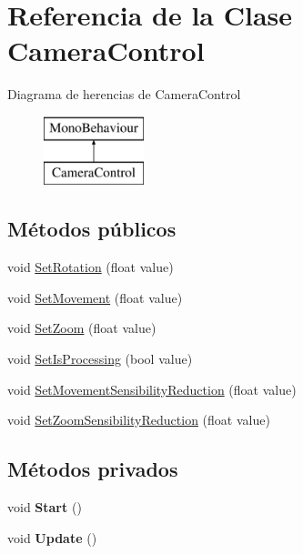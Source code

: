 \hypertarget{class_camera_control}{}\section{Referencia de la Clase Camera\+Control}
\label{class_camera_control}
Diagrama de herencias de Camera\+Control\begin{figure}[H]
\begin{center}
\leavevmode
\includegraphics[height=2.000000cm]{class_camera_control}
\end{center}
\end{figure}
\subsection*{Métodos públicos}
\begin{DoxyCompactItemize}
\item 
void \mbox{\hyperlink{class_camera_control_a7dfdd3783b057fd9941f20a634b95b03}{Set\+Rotation}} (float value)
\item 
void \mbox{\hyperlink{class_camera_control_a2307b3b28fd8f9f40248fc0441f916de}{Set\+Movement}} (float value)
\item 
void \mbox{\hyperlink{class_camera_control_a6c7f7816a4bff734280e19f65ef9df87}{Set\+Zoom}} (float value)
\item 
void \mbox{\hyperlink{class_camera_control_a715690bfd42a136da5b5880debb2e420}{Set\+Is\+Processing}} (bool value)
\item 
void \mbox{\hyperlink{class_camera_control_ab3ac3df0eb5347d1f7eb356f4226a696}{Set\+Movement\+Sensibility\+Reduction}} (float value)
\item 
void \mbox{\hyperlink{class_camera_control_a77c2147ce9a478e7fbee646fe049aa02}{Set\+Zoom\+Sensibility\+Reduction}} (float value)
\end{DoxyCompactItemize}
\subsection*{Métodos privados}
\begin{DoxyCompactItemize}
\item 
\mbox{\label{class_camera_control_af93c098f6ebf3501a41912d88accc1f2}} 
void {\bfseries Start} ()
\item 
\mbox{\label{class_camera_control_ad597a309f58a7c0e2f7f8837a22f4707}} 
void {\bfseries Update} ()
\end{DoxyCompactItemize}

